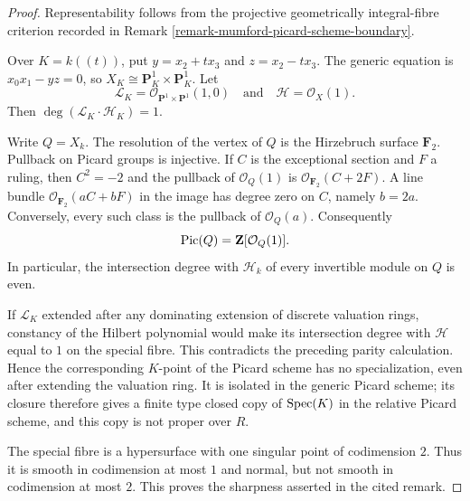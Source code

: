 \begin{proof}
Representability follows from the projective geometrically integral-fibre
criterion recorded in Remark
\ref{remark-mumford-picard-scheme-boundary}.

Over $K=k((t))$, put $y=x_2+tx_3$ and $z=x_2-tx_3$. The generic equation is
$x_0x_1-yz=0$, so $X_K\cong\mathbf P^1_K\times\mathbf P^1_K$. Let
$$
\mathcal{L}_K=\mathcal{O}_{\mathbf P^1\times\mathbf P^1}(1,0)
\quad\text{and}\quad
\mathcal{H}=\mathcal{O}_X(1).
$$
Then $\deg(\mathcal{L}_K\cdot\mathcal{H}_K)=1$.

Write $Q=X_k$. The resolution of the vertex of $Q$ is the Hirzebruch surface
$\mathbf F_2$. Pullback on Picard groups is injective. If $C$ is the
exceptional section and $F$ a ruling, then
$C^2=-2$ and the pullback of $\mathcal{O}_Q(1)$ is
$\mathcal{O}_{\mathbf F_2}(C+2F)$. A line bundle
$\mathcal{O}_{\mathbf F_2}(aC+bF)$ in the image has degree zero on $C$,
namely $b=2a$. Conversely, every such class is the pullback of
$\mathcal{O}_Q(a)$. Consequently
$$
\mathop{\mathrm{Pic}}\nolimits(Q)=\mathbf Z[\mathcal{O}_Q(1)].
$$
In particular, the intersection degree with $\mathcal{H}_k$ of every
invertible module on $Q$ is even.

If $\mathcal{L}_K$ extended after any dominating extension of discrete
valuation rings, constancy of the Hilbert polynomial would make its
intersection degree with $\mathcal{H}$ equal to $1$ on the special fibre.
This contradicts the preceding parity calculation. Hence the corresponding
$K$-point of the Picard scheme has no specialization, even after extending
the valuation ring. It is isolated in the generic Picard scheme; its closure
therefore gives a finite type closed copy of $\mathop{\mathrm{Spec}}(K)$ in the relative
Picard scheme, and this copy is not proper over $R$.

The special fibre is a hypersurface with one singular point of codimension
$2$. Thus it is smooth in codimension at most $1$ and normal, but not smooth
in codimension at most $2$. This proves the sharpness asserted in the cited
remark.
\end{proof}

